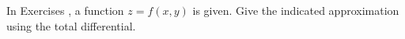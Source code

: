 {\noindent In Exercises}
{, a function $z=f(x,y)$ is given. Give the indicated approximation using the total differential.}
